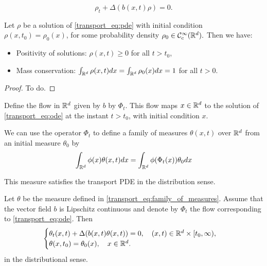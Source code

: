 \documentclass{article}
\begin{document}
\begin{equation}\label{transport_eq:pde}
\rho_t + \Delta(b(x,t) \rho) = 0.
\end{equation}

\begin{proposition}    
Let $\rho$ be a solution of \eqref{transport_eq:pde} with initial condition $\rho(x,t_0) = \rho_0(x)$, for some probability density $\rho_0 \in \mathcal{C}_c^\infty (\mathbb{R}^d).$ Then we have:
\begin{itemize}
    \item Positivity of solutions: $\rho(x,t) \geq 0$ for all $t> t_0$,
    \item Mass conservation: $\int_{\mathbb{R}^d} \rho(x,t) dx = \int_{\mathbb{R}^d} \rho_0(x) dx = 1$ for all $t > 0$.
\end{itemize}
\end{proposition}

\begin{proof}
    To do.
\end{proof}

Define the flow in $\mathbb{R}^d$ given by $b$ by $\Phi_t$. This flow maps $x\in \mathbb{R}^d$ to the solution of \eqref{transport_eq:ode} at the instant $t > t_0$, with initial condition $x$.

We can use the operator $\Phi_t$ to define a family of measures $\theta(x,t)$ over $\mathbb{R}^d$ from an initial measure $\theta_0$ by 
\begin{equation}\label{transport_eq:family_of_measures}
\int_{\mathbb{R}^d} \phi(x) \theta(x,t) dx = \int_{\mathbb{R}^d} \phi(\Phi_t(x)) \theta_0 dx    
\end{equation}

This measure satisfies the transport PDE in the distribution sense. 
\begin{proposition}
Let $\theta$ be the measure defined in \eqref{transport_eq:family_of_measures}. Assume that the vector field $b$ is Lipschitz continuous and denote by $\Phi_t$ the flow corresponding to \eqref{transport_eq:ode}. Then
\begin{equation}\label{transport_eq:pde_for_measures}
    \begin{cases}
        \theta_t(x,t) + \Delta(b(x,t) \theta(x,t)) = 0, \quad (x,t) \in \mathbb{R}^d \times [t_0,\infty),\\
        \theta(x,t_0) = \theta_0(x), \quad x\in \mathbb{R}^d.
    \end{cases}
\end{equation}
in the distributional sense.
\end{proposition}
\end{document}
